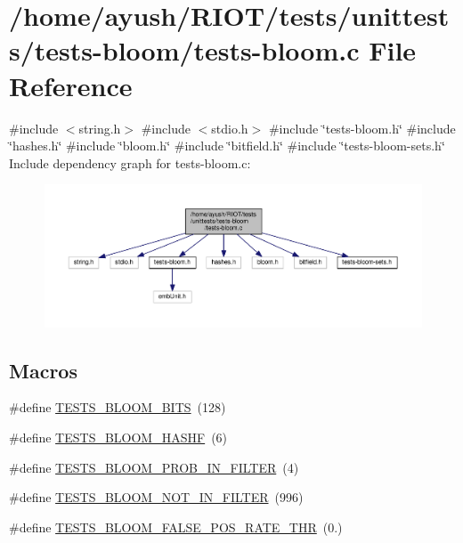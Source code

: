 \hypertarget{tests-bloom_8c}{}\section{/home/ayush/\+R\+I\+O\+T/tests/unittests/tests-\/bloom/tests-\/bloom.c File Reference}
\label{tests-bloom_8c}
{\ttfamily \#include $<$string.\+h$>$}\newline
{\ttfamily \#include $<$stdio.\+h$>$}\newline
{\ttfamily \#include \char`\"{}tests-\/bloom.\+h\char`\"{}}\newline
{\ttfamily \#include \char`\"{}hashes.\+h\char`\"{}}\newline
{\ttfamily \#include \char`\"{}bloom.\+h\char`\"{}}\newline
{\ttfamily \#include \char`\"{}bitfield.\+h\char`\"{}}\newline
{\ttfamily \#include \char`\"{}tests-\/bloom-\/sets.\+h\char`\"{}}\newline
Include dependency graph for tests-\/bloom.c\+:
\nopagebreak
\begin{figure}[H]
\begin{center}
\leavevmode
\includegraphics[width=350pt]{tests-bloom_8c__incl}
\end{center}
\end{figure}
\subsection*{Macros}
\begin{DoxyCompactItemize}
\item 
\#define \hyperlink{tests-bloom_8c_aac99c3bfab18f44daa9cb459630c15dc}{T\+E\+S\+T\+S\+\_\+\+B\+L\+O\+O\+M\+\_\+\+B\+I\+TS}~(128)
\item 
\#define \hyperlink{tests-bloom_8c_a301bba6dcc93225ff24b711b215d5f64}{T\+E\+S\+T\+S\+\_\+\+B\+L\+O\+O\+M\+\_\+\+H\+A\+S\+HF}~(6)
\item 
\#define \hyperlink{tests-bloom_8c_a5c31d066a3c945eb3e20fb0a5246a113}{T\+E\+S\+T\+S\+\_\+\+B\+L\+O\+O\+M\+\_\+\+P\+R\+O\+B\+\_\+\+I\+N\+\_\+\+F\+I\+L\+T\+ER}~(4)
\item 
\#define \hyperlink{tests-bloom_8c_a1380be67d928d43fdb14902ebf72c208}{T\+E\+S\+T\+S\+\_\+\+B\+L\+O\+O\+M\+\_\+\+N\+O\+T\+\_\+\+I\+N\+\_\+\+F\+I\+L\+T\+ER}~(996)
\item 
\#define \hyperlink{tests-bloom_8c_af981a84238d80a4ad901be707c6cf4d8}{T\+E\+S\+T\+S\+\_\+\+B\+L\+O\+O\+M\+\_\+\+F\+A\+L\+S\+E\+\_\+\+P\+O\+S\+\_\+\+R\+A\+T\+E\+\_\+\+T\+HR}~(0.)
\end{DoxyCompactItemize}
